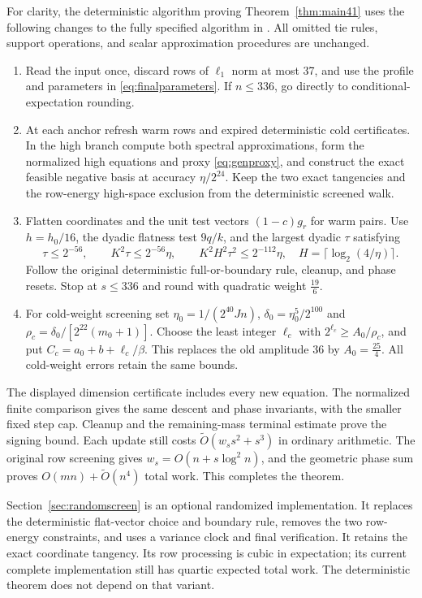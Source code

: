 \documentclass[11pt]{amsart}
\theoremstyle{remark}\newtheorem{remark}[theorem]{Remark}
\begin{document}
For clarity, the deterministic algorithm proving Theorem~\ref{thm:main41}
uses the following changes to the fully specified algorithm in
\cite{baseline}. All omitted tie rules, support operations, and scalar
approximation procedures are unchanged.
\begin{enumerate}
\item Read the input once, discard rows of $\ell_1$ norm at most 37,
and use the profile and parameters in \eqref{eq:finalparameters}. If
$n\le336$, go directly to conditional-expectation rounding.
\item At each anchor refresh warm rows and expired deterministic cold
certificates. In the high branch compute both spectral approximations,
form the normalized high equations and proxy \eqref{eq:genproxy},
and construct the exact feasible negative basis at accuracy
$\eta/2^{24}$. Keep the two exact tangencies and the row-energy
high-space exclusion from the deterministic screened walk.
\item Flatten coordinates and the unit test vectors $(1-c)g_r$ for warm pairs. Use $h=h_0/16$,
the dyadic flatness test $9q/k$, and the largest dyadic $\tau$ satisfying
\[
 \tau\le2^{-56},\qquad K^2\tau\le2^{-56}\eta,
 \qquad K^2H^2\tau^2\le2^{-112}\eta,
 \quad H=\lceil\log_2(4/\eta)\rceil.
\]
Follow the original deterministic full-or-boundary rule, cleanup,
and phase resets. Stop at $s\le336$ and round with quadratic weight $\frac{19}{6}$.
\item For cold-weight screening set
$\eta_0=1/(2^{40}Jn)$, $\delta_0=\eta_0^5/2^{100}$ and
$\rho_c=\delta_0/[2^{22}(m_0+1)]$. Choose the least integer $\ell_c$
with $2^{\ell_c}\ge A_0/\rho_c$, and put
$C_c=a_0+b+\ell_c/\beta$. This replaces the old amplitude 36 by
$A_0=\frac{25}{4}$. All cold-weight errors retain the same bounds.
\end{enumerate}
The displayed dimension certificate includes every new equation.
The normalized finite comparison gives the same descent and phase
invariants, with the smaller fixed step cap. Cleanup and the remaining-mass
terminal estimate prove the signing bound. Each update still costs
$\widetilde O(w_s s^2+s^3)$ in ordinary arithmetic. The original row
screening gives $w_s=O(n+s\log^2 n)$, and the geometric phase sum proves
$O(mn)+\widetilde O(n^4)$ total work. This completes the theorem.

Section~\ref{sec:randomscreen} is an optional randomized implementation.
It replaces the deterministic flat-vector choice and boundary rule,
removes the two row-energy constraints, and uses a variance clock and
final verification. It retains the exact coordinate tangency. Its row
processing is cubic in expectation; its current complete implementation
still has quartic expected total work. The deterministic theorem does not
depend on that variant.
\end{document}
